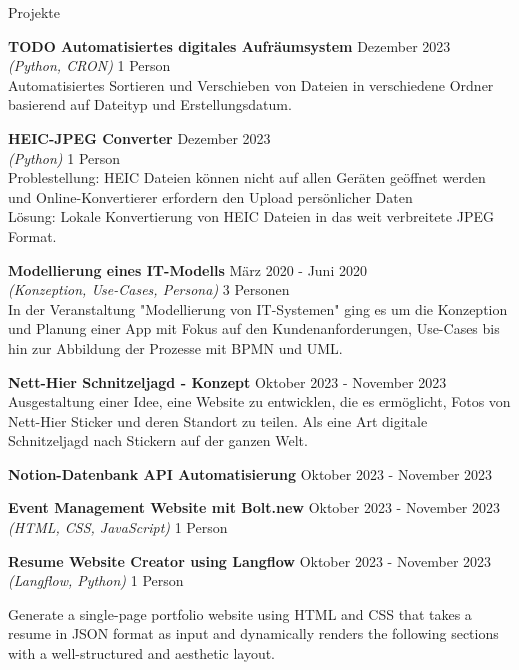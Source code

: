 \documentclass{resume} %
\begin{document}
\begin{rSection}{Projekte}
\begin{adjustwidth}{0.5cm}{}
        \item \textbf{TODO Automatisiertes digitales Aufräumsystem} \hfill {Dezember 2023}\\ 
        \textit{(Python, CRON)} \hfill {1 Person}\\
        {Automatisiertes Sortieren und Verschieben von Dateien in verschiedene Ordner basierend auf Dateityp und Erstellungsdatum.}
        
        \item \textbf{HEIC-JPEG Converter} \hfill {Dezember 2023}\\
        \textit{(Python)} \hfill {1 Person}\\
        {Problestellung: HEIC Dateien können nicht auf allen Geräten geöffnet werden und Online-Konvertierer erfordern den Upload persönlicher Daten \\
        Lösung: Lokale Konvertierung von HEIC Dateien in das weit verbreitete JPEG Format.}
        
        \item \textbf{Modellierung eines IT-Modells} \hfill {März 2020 - Juni 2020} \\
        \textit{(Konzeption, Use-Cases, Persona)} \hfill {3 Personen}\\ 
        {In der Veranstaltung "Modellierung von IT-Systemen" ging es um die Konzeption und Planung einer App mit Fokus auf den Kundenanforderungen, Use-Cases bis hin zur Abbildung der Prozesse mit BPMN und UML.}
        
        \item \textbf{Nett-Hier Schnitzeljagd - Konzept} \hfill {Oktober 2023 - November 2023} \\
        {Ausgestaltung einer Idee, eine Website zu entwicklen, die es ermöglicht, Fotos von Nett-Hier Sticker und deren Standort zu teilen. Als eine Art digitale Schnitzeljagd nach Stickern auf der ganzen Welt.}
    
        \item \textbf{Notion-Datenbank API Automatisierung} \hfill {Oktober 2023 - November 2023} \\
        
        \item \textbf{Event Management Website mit Bolt.new} \hfill {Oktober 2023 - November 2023} \\
        \textit{(HTML, CSS, JavaScript)} \hfill {1 Person}\\

        \item \textbf{Resume Website Creator using Langflow} \hfill {Oktober 2023 - November 2023} \\
        \textit{(Langflow, Python)} \hfill {1 Person}\\
        \raggedright{Generate a single-page portfolio website using HTML and CSS that takes a resume in JSON format as input and dynamically renders the following sections with a well-structured and aesthetic layout.}


\end{adjustwidth}
\end{rSection}
\end{document}
